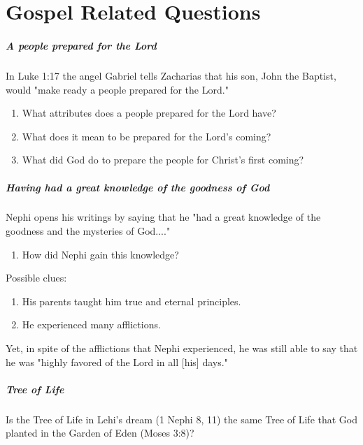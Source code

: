 \chapter{Gospel Related Questions}

\paragraph{A people prepared for the Lord}
In Luke 1:17 the angel Gabriel tells Zacharias that his son, John the Baptist, would "make ready a people prepared for the Lord."
\begin{enumerate}
  \item What attributes does a people prepared for the Lord have?
  \item What does it mean to be prepared for the Lord's coming?
  \item What did God do to prepare the people for Christ's first coming?
\end{enumerate}

\paragraph{Having had a great knowledge of the goodness of God}
Nephi opens his writings by saying that he "had a great knowledge of the goodness and the mysteries of God...."
\begin{enumerate}
  \item How did Nephi gain this knowledge?
\end{enumerate}

Possible clues:
\begin{enumerate}
  \item His parents taught him true and eternal principles.
  \item He experienced many afflictions.
\end{enumerate}

Yet, in spite of the afflictions that Nephi experienced, he was still able to say that he was "highly favored of the Lord in all [his] days."

\paragraph{Tree of Life}
Is the Tree of Life in Lehi's dream (1 Nephi 8, 11) the same Tree of Life that God planted in the Garden of Eden (Moses 3:8)?

